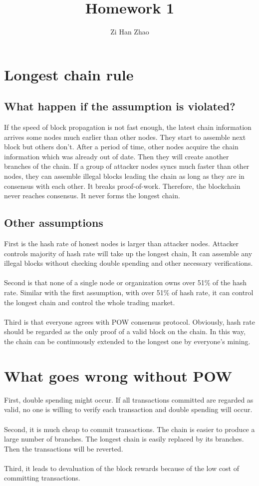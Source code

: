 \documentclass{article}
\author{Zi Han Zhao}
\affil{1001103708}
\title{Homework 1}
\date{}
\begin{document}
\maketitle
\section{Longest chain rule}
\renewcommand{\thesubsection}{(\alph{subsection})}
\subsection{What happen if the assumption is violated?}
If the speed of block propagation is not fast enough, the latest chain information arrives some nodes much earlier than other nodes. They start to assemble next block but others don't. After a period of time, other nodes acquire the chain information which was already out of date. Then they will create another branches of the chain. If a group of attacker nodes syncs much faster than other nodes, they can assemble illegal blocks leading the chain as long as they are in consensus with each other. It breaks proof-of-work. Therefore, the blockchain never reaches consensus. It never forms the longest chain.
\subsection{Other assumptions}
First is the hash rate of honest nodes is larger than attacker nodes. Attacker controls majority of hash rate will take up the longest chain, It can assemble any illegal blocks without checking double spending and other necessary verifications.\\\\
Second is that none of a single node or organization owns over 51\% of the hash rate. Similar with the first assumption, with over 51\% of hash rate, it can control the longest chain and control the whole trading market.\\\\
Third is that everyone agrees with POW consensus protocol. Obviously, hash rate should be regarded as the only proof of a valid block on the chain. In this way, the chain can be continuously extended to the longest one by everyone's mining.
\section{What goes wrong without POW}
First, double spending might occur. If all transactions committed are regarded as valid, no one is willing to verify each transaction and double spending will occur.\\\\
Second, it is much cheap to commit transactions. The chain is easier to produce a large number of branches. The longest chain is easily replaced by its branches. Then the transactions will be reverted.\\\\
Third, it leads to devaluation of the block rewards because of the low cost of committing transactions.
\end{document}
